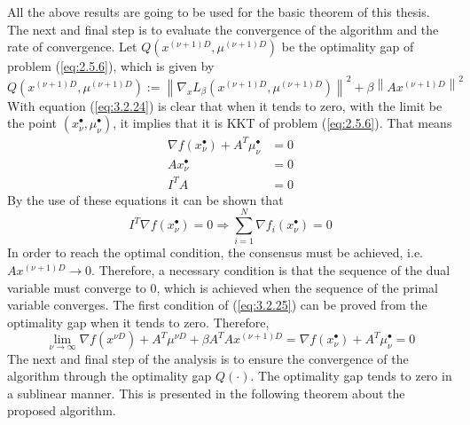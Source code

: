     All the above results are going to be used for the basic theorem of this thesis. The next and final step is to evaluate the convergence of the algorithm and the rate of convergence. Let $Q(x^{(\nu + 1)D}, \mu^{(\nu + 1)D})$ be the optimality gap of problem (\ref{eq:2.5.6}), which is given by
    \begin{equation}\label{eq:3.2.24}
        Q(x^{(\nu + 1)D}, \mu^{(\nu + 1)D}) := \left \lVert \nabla_x L_{\beta} (x^{(\nu + 1)D},\mu^{(\nu + 1)D}) \right \rVert^2 + \beta\left \lVert Ax^{(\nu + 1)D} \right \rVert^2
    \end{equation}
    With equation (\ref{eq:3.2.24}) is clear that when it tends to zero, with the limit be the point $(x_{\nu}^{\bullet}, \mu_{\nu}^{\bullet})$, it implies that it is KKT of problem (\ref{eq:2.5.6}). That means
    \begin{equation}\label{eq:3.2.25}
        \begin{align}
            \nabla f(x_{\nu}^{\bullet}) + A^T \mu_{\nu}^{\bullet} &= 0\\
            Ax_{\nu}^{\bullet} &= 0\\
            I^TA &= 0
        \end{align}
    \end{equation}
    By the use of these equations it can be shown that
    \begin{equation*}
        I^T \nabla f(x_{\nu}^{\bullet}) = 0 \Rightarrow
        \sum_{i = 1}^{N} \nabla f_i(x_{\nu}^{\bullet}) = 0
    \end{equation*}
    In order to reach the optimal condition, the consensus must be achieved, i.e. $Ax^{(\nu + 1)D} \to 0$. Therefore, a necessary condition is that the sequence of the dual variable must converge to 0, which is achieved when the sequence of the primal variable converges. The first condition of (\ref{eq:3.2.25}) can be proved from the optimality gap when it tends to zero. Therefore,
    \begin{equation*}
        \lim_{\nu \to \infty} \nabla f(x^{\nu D}) + A^T\mu^{\nu D} + \beta A^TAx^{(\nu + 1)D} = \nabla f(x_{\nu}^{\bullet}) + A^T \mu_{\nu}^{\bullet} = 0
    \end{equation*}
    The next and final step of the analysis is to ensure the convergence of the algorithm through the optimality gap $Q(\cdot)$. The optimality gap tends to zero in a sublinear manner. This is presented in the following theorem about the proposed algorithm.

